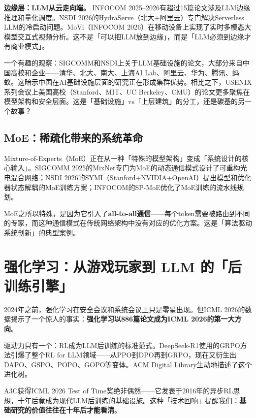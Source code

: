 \documentclass[12pt,a4paper]{ctexart}
\begin{document}
\textbf{边缘层：LLM从云走向端。} INFOCOM 2025--2026有超过15篇论文涉及LLM边缘推理和量化调度。NSDI 2026的HydraServe（北大+阿里云）专门解决Serverless LLM的冷启动问题。MoVi（INFOCOM 2026）在移动设备上实现了实时多模态大模型交互式视频分析。这不是「可以把LLM放到边缘」，而是「LLM必须到边缘才有商业模式」。

\begin{thinkbox}
一个有趣的观察：SIGCOMM和NSDI上关于LLM基础设施的论文，大部分来自中国高校和企业——清华、北大、南大、上海AI Lab、阿里云、华为、腾讯、蚂蚁。这暗示中国在AI基础设施层面的研究正在形成集群优势。相比之下，USENIX系列会议上美国高校（Stanford、MIT、UC Berkeley、CMU）的论文更多聚焦在模型架构和安全层面。这是「基础设施」vs「上层建筑」的分工，还是碳基的另一个故事？
\end{thinkbox}

\subsection{MoE：稀疏化带来的系统革命}

Mixture-of-Experts（MoE）正在从一种「特殊的模型架构」变成「系统设计的核心输入」。SIGCOMM 2025的MixNet专门为MoE的动态通信模式设计了可重构光电混合网络；NSDI 2026的SYMI（Stanford+NVIDIA+OpenAI）提出模型和优化器状态解耦的MoE训练方案；INFOCOM的SP-MoE优化了MoE训练的流水线规划。

MoE之所以特殊，是因为它引入了\textbf{all-to-all通信}——每个token需要被路由到不同的专家，而这种通信模式在传统网络架构中没有对应的优化方案。这是「算法驱动系统创新」的典型案例。

\section{强化学习：从游戏玩家到 LLM 的「后训练引擎」}

2024年之前，强化学习在安全会议和系统会议上只是零星出现。但ICML 2026的数据揭示了一个惊人的事实：\textbf{强化学习以886篇论文成为ICML 2026的第一大方向}。

驱动力只有一个：RL成为LLM后训练的标准范式。DeepSeek-R1使用的GRPO方法引爆了整个RL for LLM领域——从PPO到DPO再到GRPO，现在又衍生出DAPO、GSPO、POPO、GOPO等变体。ACM Digital Library生动地描述了这个进化树。

A3C获得ICML 2026 Test of Time奖绝非偶然——它发表于2016年的异步RL思想，十年后竟成为现代LLM后训练的基础设施。这种「技术回响」提醒我们：\textbf{基础研究的价值往往在十年后才能看清}。
\end{document}
